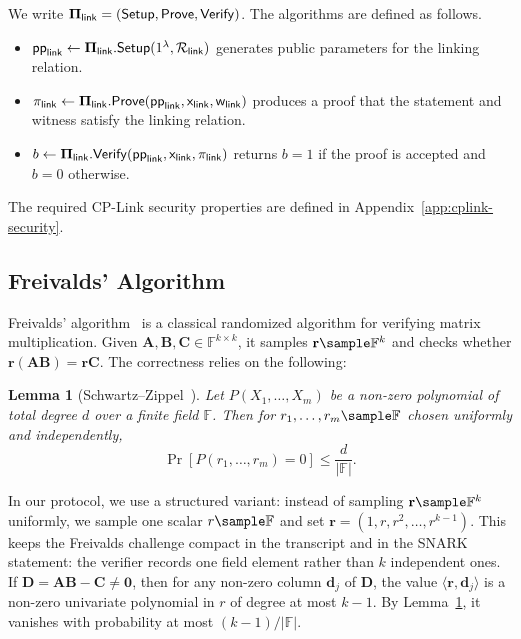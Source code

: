 \documentclass[conference,compsoc]{IEEEtran}
\newcommand{\para}{\textsf{pp}}
\newcommand{\mat}{\mathbf}          %
\newcommand{\vect}{\mathbf}         %
\newcommand{\bPi}{{\bf \Pi}}
\newcommand{\setup}{{\sf Setup}}
\newcommand{\prove}{{\sf Prove}}
\renewcommand{\verify}{{\sf Verify}}
\newcommand{\relation}{{\mathcal{R}}}
\newcommand{\stmt}{\mathsf{x}}      %
\newcommand{\wit}{\mathsf{w}}       %
\theoremstyle{plain}
\newtheorem{lemma}[theorem]{Lemma}
\theoremstyle{definition}
\theoremstyle{remark}
\begin{document}
We write \(\bPi_{\mathsf{link}}=(\setup,\prove,\verify)\). The algorithms are
defined as follows.
\begin{itemize}[leftmargin=*,nosep]
  \item \(\para_{\mathsf{link}}\gets
  \bPi_{\mathsf{link}}.\setup(1^\lambda,\relation_{\mathsf{link}})\) generates
  public parameters for the linking relation.

  \item \(\pi_{\mathsf{link}}\gets
  \bPi_{\mathsf{link}}.\prove(
  \para_{\mathsf{link}},\stmt_{\mathsf{link}},\wit_{\mathsf{link}})\) produces
  a proof that the statement and witness satisfy the linking relation.

  \item \(b\gets\bPi_{\mathsf{link}}.\verify(
  \para_{\mathsf{link}},\stmt_{\mathsf{link}},\pi_{\mathsf{link}})\) returns
  \(b=1\) if the proof is accepted and \(b=0\) otherwise.
\end{itemize}
The required CP-Link security properties are defined in
Appendix~\ref{app:cplink-security}.

\subsection{Freivalds' Algorithm}
\label{sec:prelim-freivalds}

Freivalds' algorithm~\cite{freivalds1977probabilistic} is a classical randomized algorithm for verifying matrix multiplication.
Given $\mat{A}, \mat{B}, \mat{C} \in \mathbb{F}^{k \times k}$, it samples $\vect{r} \sample \mathbb{F}^k$ and checks whether $\vect{r}(\mat{A}\mat{B}) = \vect{r}\mat{C}$.
The correctness relies on the following:

\begin{lemma}[Schwartz--Zippel~\cite{schwartz1980fast,zippel1979probabilistic}]\label{lem:sz}
Let $P(X_1, \ldots, X_m)$ be a non-zero polynomial of total degree $d$ over a finite field $\mathbb{F}$.
Then for $r_1, \ldots, r_m \sample \mathbb{F}$ chosen uniformly and independently,
\[
\Pr[P(r_1, \ldots, r_m) = 0] \le \frac{d}{|\mathbb{F}|}.
\]
\end{lemma}

In our protocol, we use a structured variant: instead of sampling $\vect{r} \sample \mathbb{F}^k$ uniformly, we sample one scalar $r \sample \mathbb{F}$ and set $\vect{r} = (1, r, r^2, \ldots, r^{k-1})$.
This keeps the Freivalds challenge compact in the transcript and in the SNARK
statement: the verifier records one field element rather than $k$ independent
ones. If $\mat{D} = \mat{A}\mat{B} - \mat{C} \neq \mat{0}$, then for any non-zero
column $\vect{d}_j$ of $\mat{D}$, the value $\langle \vect{r}, \vect{d}_j \rangle$ is a non-zero univariate polynomial in
$r$ of degree at most $k-1$.
By Lemma~\ref{lem:sz}, it vanishes with probability at most $(k-1)/|\mathbb{F}|$.
\end{document}
